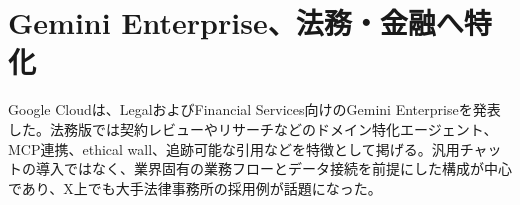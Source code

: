 \section{Gemini Enterprise、法務・金融へ特化}
Google Cloudは、LegalおよびFinancial Services向けのGemini Enterpriseを発表した。法務版では契約レビューやリサーチなどのドメイン特化エージェント、MCP連携、ethical wall、追跡可能な引用などを特徴として掲げる。汎用チャットの導入ではなく、業界固有の業務フローとデータ接続を前提にした構成が中心であり、X上でも大手法律事務所の採用例が話題になった。
